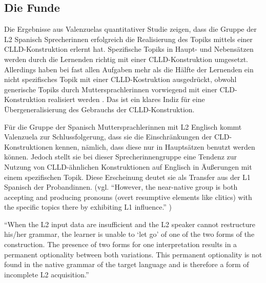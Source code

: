 
\subsection{Die Funde}

Die Ergebnisse aus Valenzuelas quantitativer Studie zeigen, dass die Gruppe der L2 Spanisch Sprecherinnen erfolgreich die Realisierung des Topiks mittels einer CLLD-Konstruktion erlernt hat.
Spezifische Topiks in Haupt- und Nebensätzen werden durch die Lernenden richtig mit einer CLLD-Konstruktion umgesetzt.
Allerdings haben bei fast allen Aufgaben mehr als die Hälfte der Lernenden ein nicht spezifisches Topik mit einer CLLD-Kostruktion ausgedrückt, obwohl generische Topiks durch Muttersprachlerinnen vorwiegend mit einer CLD-Konstruktion realisiert werden \cite{Valenzuela05}.
Das ist ein klares Indiz für eine Übergeneralisierung des Gebrauchs der CLLD-Konstruktion.

Für die Gruppe der Spanisch Muttersprachlerinnen mit L2 Englisch kommt Valenzuela zur Schlussfolgerung,
dass sie die Einschränkungen der CLD-Konstruktionen kennen, nämlich, dass diese nur in Hauptsätzen benutzt werden können.
Jedoch stellt sie bei dieser Sprecherinnengruppe eine Tendenz zur Nutzung von CLLD-ähnlichen Konstruktionen auf Englisch in Äußerungen mit einem spezifischen Topik. %
Diese Erscheinung deutet sie als Transfer aus der L1 Spanisch der Probandinnen.
(vgl. ``However, the near-native group is both accepting and producing pronouns (overt resumptive elements like clitics) with the specific topics there by exhibiting L1 influence.'' \cite{Valenzuela05})

\cite{Valenzuela05}
``When the L2 input data are insufficient and the L2 speaker cannot restructure his/her grammar, the learner is unable to `let go' of
one of the two forms of the construction.
The presence of two forms for one interpretation results in a permanent optionality between both variations.
This permanent optionality is not found in the native grammar of the target language and is therefore a form of incomplete L2 acquisition.''


